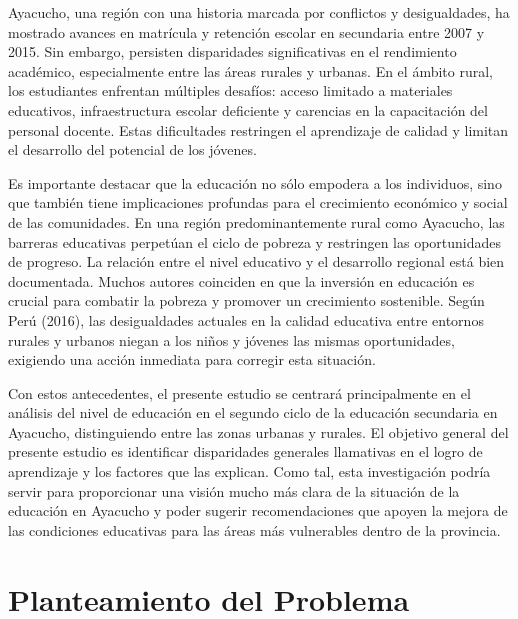 \documentclass[
]{article}
\begin{document}
Ayacucho, una región con una historia marcada por conflictos y
desigualdades, ha mostrado avances en matrícula y retención escolar en
secundaria entre 2007 y 2015. Sin embargo, persisten disparidades
significativas en el rendimiento académico, especialmente entre las
áreas rurales y urbanas. En el ámbito rural, los estudiantes enfrentan
múltiples desafíos: acceso limitado a materiales educativos,
infraestructura escolar deficiente y carencias en la capacitación del
personal docente. Estas dificultades restringen el aprendizaje de
calidad y limitan el desarrollo del potencial de los jóvenes.

Es importante destacar que la educación no sólo empodera a los
individuos, sino que también tiene implicaciones profundas para el
crecimiento económico y social de las comunidades. En una región
predominantemente rural como Ayacucho, las barreras educativas perpetúan
el ciclo de pobreza y restringen las oportunidades de progreso. La
relación entre el nivel educativo y el desarrollo regional está bien
documentada. Muchos autores coinciden en que la inversión en educación
es crucial para combatir la pobreza y promover un crecimiento
sostenible. Según Perú (2016), las desigualdades actuales en la calidad
educativa entre entornos rurales y urbanos niegan a los niños y jóvenes
las mismas oportunidades, exigiendo una acción inmediata para corregir
esta situación.

Con estos antecedentes, el presente estudio se centrará principalmente
en el análisis del nivel de educación en el segundo ciclo de la
educación secundaria en Ayacucho, distinguiendo entre las zonas urbanas
y rurales. El objetivo general del presente estudio es identificar
disparidades generales llamativas en el logro de aprendizaje y los
factores que las explican. Como tal, esta investigación podría servir
para proporcionar una visión mucho más clara de la situación de la
educación en Ayacucho y poder sugerir recomendaciones que apoyen la
mejora de las condiciones educativas para las áreas más vulnerables
dentro de la provincia.

\newpage

\section*{Planteamiento del Problema}\label{planteamiento-del-problema}
\end{document}
